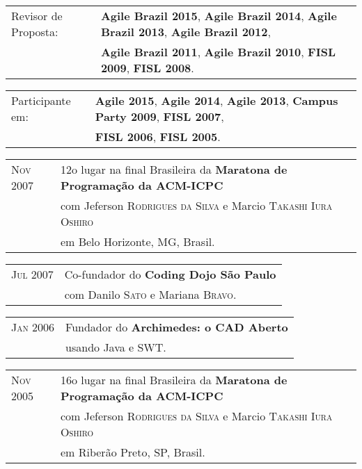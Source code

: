\documentclass[letter,10pt]{article}
\begin{document}
\begin{tabular}{p{2.5cm}l}
  Revisor de Proposta: & \textbf{Agile Brazil 2015}, \textbf{Agile Brazil 2014}, \textbf{Agile Brazil 2013}, \textbf{Agile Brazil 2012},\\
  & \textbf{Agile Brazil 2011}, \textbf{Agile Brazil 2010}, \textbf{FISL 2009}, \textbf{FISL 2008}.
\end{tabular}

\begin{tabular}{p{2.5cm}l}
  Participante em: & \textbf{Agile 2015}, \textbf{Agile 2014}, \textbf{Agile 2013}, \textbf{Campus Party 2009}, \textbf{FISL 2007},\\
  & \textbf{FISL 2006}, \textbf{FISL 2005}.
\end{tabular}

\begin{tabular}{p{2.5cm}l}
  \textsc{Nov 2007} & 12o lugar na final Brasileira da
  \textbf{Maratona de Programação da ACM-ICPC}\\
  & com Jeferson \textsc{Rodrigues da Silva} e Marcio
  \textsc{Takashi Iura Oshiro}\\
  & em Belo Horizonte, MG, Brasil.\\
\end{tabular}

\begin{tabular}{p{2.5cm}l}
  \textsc{Jul 2007} & Co-fundador do \textbf{Coding Dojo São Paulo}\\
  & com Danilo \textsc{Sato} e Mariana \textsc{Bravo}.\\
\end{tabular}

\begin{tabular}{p{2.5cm}l}
  \textsc{Jan 2006} & Fundador do \textbf{Archimedes: o CAD Aberto}\\
  & usando Java e SWT.\\
\end{tabular}

\begin{tabular}{p{2.5cm}l}
  \textsc{Nov 2005} & 16o lugar na final Brasileira da
  \textbf{Maratona de Programação da ACM-ICPC}\\
  & com Jeferson \textsc{Rodrigues da Silva} e Marcio
  \textsc{Takashi Iura Oshiro}\\
  & em Riberão Preto, SP, Brasil.\\
\end{tabular}
\end{document}
